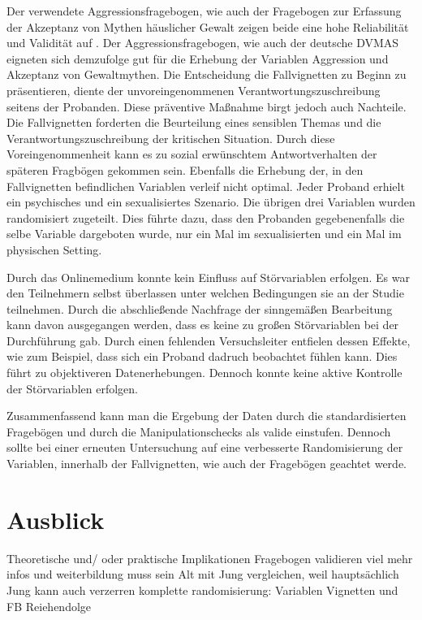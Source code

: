 Der verwendete Aggressionsfragebogen, wie auch der Fragebogen zur Erfassung der Akzeptanz von Mythen häuslicher Gewalt zeigen beide eine hohe Reliabilität und Validität auf \parencite{Peters2003, Aggressionsfragebogen}. Der Aggressionsfragebogen, wie auch der deutsche DVMAS eigneten sich demzufolge gut für die Erhebung der Variablen Aggression und Akzeptanz von Gewaltmythen. 
Die Entscheidung die Fallvignetten zu Beginn zu präsentieren, diente der unvoreingenommenen Verantwortungszuschreibung seitens der Probanden. Diese präventive Maßnahme birgt jedoch auch Nachteile. Die Fallvignetten forderten die Beurteilung eines sensiblen Themas und die Verantwortungszuschreibung der kritischen Situation. Durch diese Voreingenommenheit kann es zu sozial erwünschtem Antwortverhalten der späteren Fragbögen gekommen sein. Ebenfalls die Erhebung der, in den Fallvignetten befindlichen Variablen verleif nicht optimal. Jeder Proband erhielt ein psychisches und ein sexualisiertes Szenario. Die übrigen drei Variablen wurden randomisiert zugeteilt. Dies führte dazu, dass den Probanden gegebenenfalls die selbe Variable dargeboten wurde, nur ein Mal im sexualisierten und ein Mal im physischen Setting. 

Durch das Onlinemedium konnte kein Einfluss auf Störvariablen erfolgen. Es war den Teilnehmern selbst überlassen unter welchen Bedingungen sie an der Studie teilnehmen. Durch die abschließende Nachfrage der sinngemäßen Bearbeitung kann davon ausgegangen werden, dass es keine zu großen Störvariablen bei der Durchführung gab. Durch einen fehlenden Versuchsleiter entfielen dessen Effekte, wie zum Beispiel, dass sich ein Proband dadruch beobachtet fühlen kann. Dies führt zu objektiveren Datenerhebungen. Dennoch konnte keine aktive Kontrolle der Störvariablen erfolgen.

Zusammenfassend kann man die Ergebung der Daten durch die standardisierten Fragebögen und durch die Manipulationschecks als valide einstufen. Dennoch sollte bei einer erneuten Untersuchung auf eine verbesserte Randomisierung der Variablen, innerhalb der Fallvignetten, wie auch der Fragebögen geachtet werde. 


\section{Ausblick}
Theoretische und/ oder praktische Implikationen     \label{sec_5.4}
Fragebogen validieren
viel mehr infos und weiterbildung muss sein
Alt mit Jung vergleichen, weil hauptsächlich Jung kann auch verzerren
komplette randomisierung: Variablen Vignetten und FB Reiehendolge